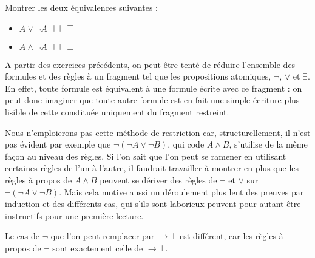 \begin{exercise}
  Montrer les deux équivalences suivantes :
  \begin{itemize}
  \item $A \lor \lnot A \dashv\vdash \top$
  \item $A \land \lnot A \dashv\vdash \bot$
  \end{itemize}
\end{exercise}

\begin{remark}
  A partir des exercices précédents, on peut être tenté de réduire l'ensemble
  des formules et des règles à un fragment tel que les propositions atomiques,
  $\lnot$, $\lor$ et $\exists$. En effet, toute formule est équivalent à une
  formule écrite avec ce fragment : on peut donc imaginer que toute autre
  formule est en fait une simple écriture plus lisible de cette constituée
  uniquement du fragment restreint.

  Nous n'emploierons pas cette méthode de restriction car, structurellement,
  il n'est pas évident par exemple que $\lnot (\lnot A \lor \lnot B)$, qui code
  $A \land B$, s'utilise de la même façon au niveau des règles. Si l'on sait que
  l'on peut se ramener en utilisant certaines règles de l'un à l'autre, il
  faudrait travailler à montrer en plus que les règles à propos de $A\land B$
  peuvent se dériver des règles de $\lnot$ et $\lor$ sur
  $\lnot (\lnot A \lor \lnot B)$. Mais cela motive aussi un déroulement plus
  lent des preuves par induction et des différents cas, qui s'ils sont
  laborieux peuvent pour autant être instructifs pour une première lecture.

  Le cas de $\lnot$ que l'on peut remplacer par $\to \bot$ est différent, car
  les règles à propos de $\lnot$ sont exactement celle de $\to \bot$.
\end{remark}


